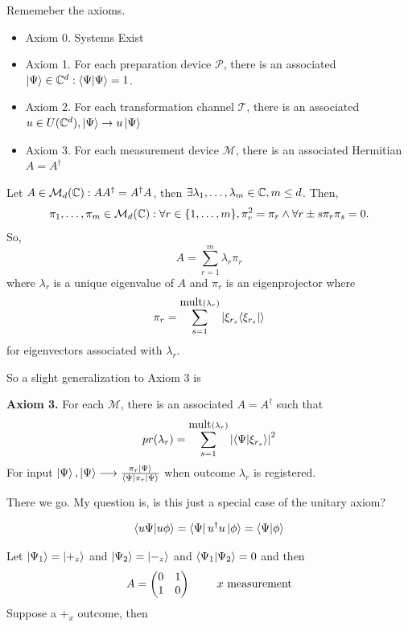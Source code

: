 \documentclass[english, 11pt]{article}
\begin{document}
       Rememeber the axioms.

        \begin{itemize}
        \item Axiom 0. Systems Exist
        \item Axiom 1. For each preparation device $\mathcal{P}$, there is an associated $\kpsi \in \C^d : \braket{\Psi}{\Psi} = 1$.
        \item Axiom 2. For each transformation channel $\mathcal{T}$, there is an associated $u \in U({\mathbb{C}}^d), \left|\Psi\right\rangle \rightarrow u\left|\Psi\right\rangle$
        \item Axiom 3. For each measurement device $\mathcal{M}$, there is an associated Hermitian $A = A^\dagger$
      \end{itemize}

      \begin{thrm}
        Let $A \in \mathcal{M}_d({\mathbb{C}}): AA^\dagger = A^\dagger A$, then $\exists \lambda_1, \ldots, \lambda_m \in {\mathbb{C}}, m \leq d$. Then,
        \[ \pi_1,\ldots,\pi_m \in \mathcal{M}_d({\mathbb{C}}) : \forall r \in \{1,\ldots,m\}, \pi_r^2 = \pi_r \land \forall r \pm s \pi_r\pi_s = 0. \]
        So,
        \[ A = \sum_{r=1}^m \lambda_r\pi_r \]
        where $\lambda_r$ is a unique eigenvalue of $A$ and $\pi_r$ is an eigenprojector where
        \[ \pi_r = \sum_{s=1}^{\mbox{mult}(\lambda_r)} \left|\xi_{r_s}{\left\langle\xi_{r_s}\right|}\right\rangle \]
        for eigenvectors associated with $\lambda_r$.
      \end{thrm}

      So a slight generalization to Axiom 3 is \newline

      \textbf{Axiom 3.} For each $\mathcal{M}$, there is an associated $A = A^\dagger$ such that
      \[ pr(\lambda_r) = \sum_{s=1}^{\mbox{mult}(\lambda_r)} \left| \braket{\Psi}{\xi_{r_s}} \right|^2 \]
      For input $\left|\Psi\right\rangle, \left|\Psi\right\rangle \longrightarrow \frac{\pi_r\left|\Psi\right\rangle}{\left\langle\Psi\right|\pi_r\left|\Psi\right\rangle}$
      when outcome $\lambda_r$ is registered.

      There we go. My question is, is this just a special case of the unitary axiom?

      \[ \braket{u\Psi}{u\phi} = \bra{\Psi}u^\dagger u\ket{\phi} = \braket{\Psi}{\phi} \]

      Let $\left|\Psi_1\right\rangle = \left|+_z\right\rangle$ and $\left|\Psi_2\right\rangle = \left|-_z\right\rangle$ and $\braket{\Psi_1}{\Psi_2} = 0$ and then
      \[ A = \mtx{0 & 1 \\ 1 & 0} \mbox{ \ \ \ \ \ \ $x$ measurement} \]
      Suppose a $+_x$ outcome, then
\end{document}
